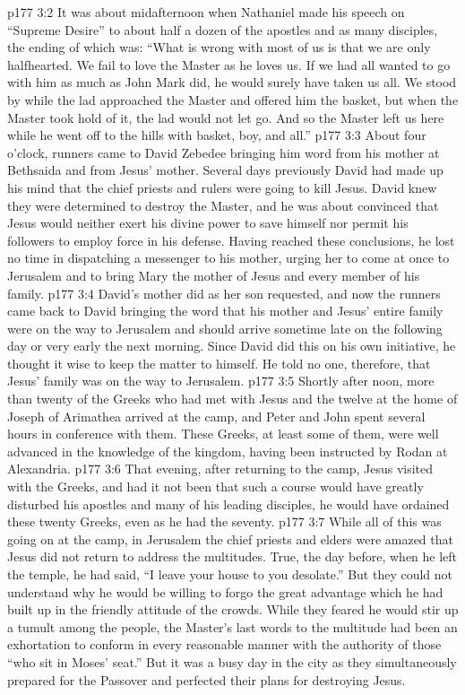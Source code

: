 \pc \vs p177 3:2 It was about midafternoon when Nathaniel made his speech on “Supreme Desire” to about half a dozen of the apostles and as many disciples, the ending of which was: “What is wrong with most of us is that we are only halfhearted. We fail to love the Master as he loves us. If we had all wanted to go with him as much as John Mark did, he would surely have taken us all. We stood by while the lad approached the Master and offered him the basket, but when the Master took hold of it, the lad would not let go. And so the Master left us here while he went off to the hills with basket, boy, and all.”
\pc \vs p177 3:3 About four o’clock, runners came to David Zebedee bringing him word from his mother at Bethsaida and from Jesus’ mother. Several days previously David had made up his mind that the chief priests and rulers were going to kill Jesus. David knew they were determined to destroy the Master, and he was about convinced that Jesus would neither exert his divine power to save himself nor permit his followers to employ force in his defense. Having reached these conclusions, he lost no time in dispatching a messenger to his mother, urging her to come at once to Jerusalem and to bring Mary the mother of Jesus and every member of his family.
\vs p177 3:4 David’s mother did as her son requested, and now the runners came back to David bringing the word that his mother and Jesus’ entire family were on the way to Jerusalem and should arrive sometime late on the following day or very early the next morning. Since David did this on his own initiative, he thought it wise to keep the matter to himself. He told no one, therefore, that Jesus’ family was on the way to Jerusalem.
\pc \vs p177 3:5 Shortly after noon, more than twenty of the Greeks who had met with Jesus and the twelve at the home of Joseph of Arimathea arrived at the camp, and Peter and John spent several hours in conference with them. These Greeks, at least some of them, were well advanced in the knowledge of the kingdom, having been instructed by Rodan at Alexandria.
\vs p177 3:6 That evening, after returning to the camp, Jesus visited with the Greeks, and had it not been that such a course would have greatly disturbed his apostles and many of his leading disciples, he would have ordained these twenty Greeks, even as he had the seventy.
\pc \vs p177 3:7 While all of this was going on at the camp, in Jerusalem the chief priests and elders were amazed that Jesus did not return to address the multitudes. True, the day before, when he left the temple, he had said, \textcolor{ubdarkred}{“I leave your house to you desolate.”} But they could not understand why he would be willing to forgo the great advantage which he had built up in the friendly attitude of the crowds. While they feared he would stir up a tumult among the people, the Master’s last words to the multitude had been an exhortation to conform in every reasonable manner with the authority of those “who sit in Moses’ seat.” But it was a busy day in the city as they simultaneously prepared for the Passover and perfected their plans for destroying Jesus.
